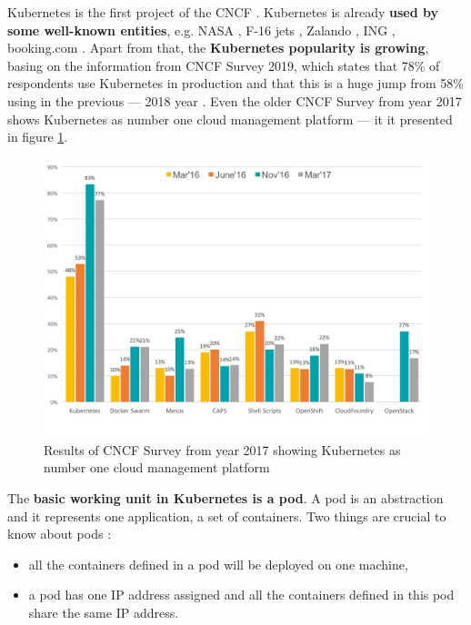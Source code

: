 Kubernetes is the first project of the CNCF \cite{article-state-machine}. Kubernetes is already \textbf{used by some well-known entities}, e.g. NASA \cite{nasa}, F-16 jets \cite{online-f16}, Zalando \cite{online-zalando}, ING \cite{online-ing}, booking.com \cite{online-bookingcom}. Apart from that, the \textbf{Kubernetes popularity is growing}, basing on the information from CNCF Survey 2019, which states that 78\% of respondents use Kubernetes in production and that this is a huge jump from 58\% using in the previous --- 2018 year \cite{cncf-2019}. Even the older CNCF Survey from year 2017 shows Kubernetes as number one cloud management platform --- it it presented in figure \ref{fig:cncf-con}.

\begin{figure}[H]
    \centering
    \includegraphics[width=12cm]{figures/cncf-container-orchestrators.png}
    \captionsetup{justification=centering,margin=2cm}
    \caption{Results of CNCF Survey from year 2017 showing Kubernetes as number one cloud management platform \cite{cncf-2017}}
    \label{fig:cncf-con}
\end{figure}

The \textbf{basic working unit in Kubernetes is a pod}. A pod is an abstraction and it represents one application, a set of containers. Two things are crucial to know about pods \cite{article-modelling-performance-k8s}:
\begin{itemize}
\item all the containers defined in a pod will be deployed on one machine,
\item a pod has one IP address assigned and all the containers defined in this pod share the same IP address.
\end{itemize}

